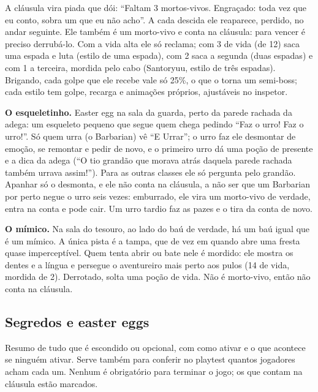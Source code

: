 \documentclass[11pt,a4paper]{article}
\begin{document}
A cláusula vira piada que dói: ``Faltam 3 mortos-vivos. Engraçado: toda vez que eu conto, sobra um que eu não acho''. A cada descida ele reaparece, perdido, no andar seguinte. Ele também é um morto-vivo e conta na cláusula: para vencer é preciso derrubá-lo. Com a vida alta ele só reclama; com 3 de vida (de 12) saca uma espada e luta (estilo de uma espada), com 2 saca a segunda (duas espadas) e com 1 a terceira, mordida pelo cabo (Santoryuu, estilo de três espadas). Brigando, cada golpe que ele recebe vale só 25\%, o que o torna um semi-boss; cada estilo tem golpe, recarga e animações próprios, ajustáveis no inspetor.

\textbf{O esqueletinho.} Easter egg na sala da guarda, perto da parede rachada da adega: um esqueleto pequeno que segue quem chega pedindo ``Faz o urro! Faz o urro!''. Só quem urra (o Barbarian) vê ``E Urrar''; o urro faz ele desmontar de emoção, se remontar e pedir de novo, e o primeiro urro dá uma poção de presente e a dica da adega (``O tio grandão que morava atrás daquela parede rachada também urrava assim!''). Para as outras classes ele só pergunta pelo grandão. Apanhar só o desmonta, e ele não conta na cláusula, a não ser que um Barbarian por perto negue o urro seis vezes: emburrado, ele vira um morto-vivo de verdade, entra na conta e pode cair. Um urro tardio faz as pazes e o tira da conta de novo.

\textbf{O mímico.} Na sala do tesouro, ao lado do baú de verdade, há um baú igual que é um mímico. A única pista é a tampa, que de vez em quando abre uma fresta quase imperceptível. Quem tenta abrir ou bate nele é mordido: ele mostra os dentes e a língua e persegue o aventureiro mais perto aos pulos (14 de vida, mordida de 2). Derrotado, solta uma poção de vida. Não é morto-vivo, então não conta na cláusula.

\subsection{Segredos e easter eggs}

Resumo de tudo que é escondido ou opcional, com como ativar e o que acontece se ninguém ativar. Serve também para conferir no playtest quantos jogadores acham cada um. Nenhum é obrigatório para terminar o jogo; os que contam na cláusula estão marcados.
\end{document}
